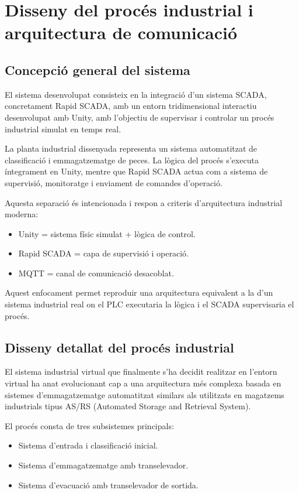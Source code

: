 \documentclass[12pt,a4paper]{report}
\begin{document}
\chapter{Disseny del procés industrial i arquitectura de comunicació}

\section{Concepció general del sistema}

El sistema desenvolupat consisteix en la integració d'un sistema SCADA, concretament Rapid SCADA, amb un entorn tridimensional interactiu desenvolupat amb Unity, amb l'objectiu de supervisar i controlar un procés industrial simulat en temps real.

La planta industrial dissenyada representa un sistema automatitzat de classificació i emmagatzematge de peces. La lògica del procés s'executa íntegrament en Unity, mentre que Rapid SCADA actua com a sistema de supervisió, monitoratge i enviament de comandes d'operació.

Aquesta separació és intencionada i respon a criteris d'arquitectura industrial moderna:

\begin{itemize}
\item Unity = sistema físic simulat + lògica de control.
\item Rapid SCADA = capa de supervisió i operació.
\item MQTT = canal de comunicació desacoblat.
\end{itemize}

Aquest enfocament permet reproduir una arquitectura equivalent a la d'un sistema industrial real on el PLC executaria la lògica i el SCADA supervisaria el procés.

\section{Disseny detallat del procés industrial}
El sistema industrial virtual que finalmente s'ha decidit realitzar en l'entorn virtual ha anat evolucionant cap a una arquitectura més complexa basada en sistemes d'emmagatzematge automatitzat similars als utilitzats en magatzems industrials tipus AS/RS (Automated Storage and Retrieval System).

El procés consta de tres subsistemes principals:

\begin{itemize}
\item Sistema d'entrada i classificació inicial.
\item Sistema d'emmagatzematge amb transelevador.
\item Sistema d'evacuació amb transelevador de sortida.
\end{itemize}
\end{document}
